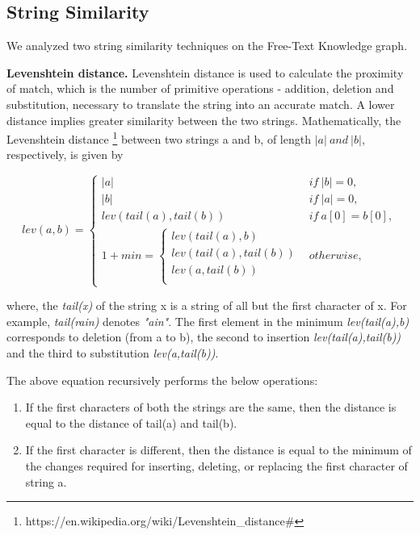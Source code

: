 \subsection{String Similarity} 
\label{sec:stringsimilarity}
We analyzed two string similarity techniques on the Free-Text Knowledge graph.

\textbf{Levenshtein distance.} 
Levenshtein distance is used to calculate the proximity of match, which is the number of primitive operations - addition, deletion and substitution, necessary to translate the string into an accurate match. A lower distance implies greater similarity between the two strings.
Mathematically, the Levenshtein distance \footnote{https://en.wikipedia.org/wiki/Levenshtein\_distance\#} between two strings a and b, of length $|a| \ and \ |b|$, respectively, is given by 

\begin{singlespace}
\begin{equation}
lev(a,b) = \left\{ \begin{array}{cl}
|a| & if \ |b|=0, \\
|b| & if \ |a|=0, \\
lev(tail(a),tail(b)) & if \ a[0]=b[0], \\
1 + min = \left\{ \begin{array}{cl}
lev(tail(a),b) \\
lev(tail(a),tail(b)) \\
lev(a,tail(b))\\
\end{array} \right.& otherwise,
\end{array} \right.
\end{equation}
\end{singlespace}

where, the \textit{tail(x)} of the string x is a string of all but the first character of x. For example, \textit{tail(rain)} denotes \textit{"ain"}. The first element in the minimum \textit{lev(tail(a),b)} corresponds to deletion (from a to b), the second to insertion \textit{lev(tail(a),tail(b))} and the third to substitution \textit{lev(a,tail(b))}.

The above equation recursively performs the below operations:
\begin{enumerate}
    \item If the first characters of both the strings are the same, then the distance is equal to the distance of tail(a) and tail(b).
    \item If the first character is different, then the distance is equal to the minimum of the changes required for inserting, deleting, or replacing the first character of string a.
\end{enumerate}

